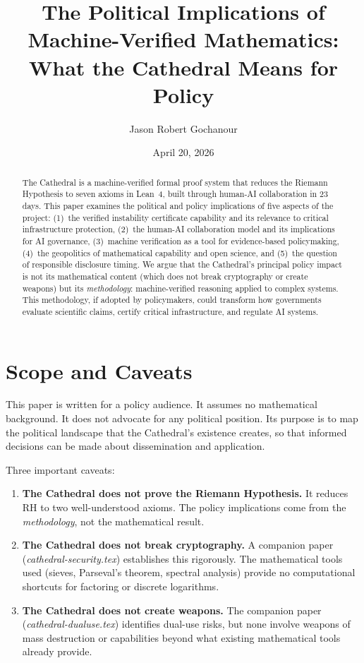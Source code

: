 \documentclass[11pt,a4paper]{article}
\title{%
  The Political Implications of Machine-Verified Mathematics:\\
  What the Cathedral Means for Policy%
}
\author{
  Jason Robert Gochanour
}
\date{April 20, 2026}
\begin{document}
\maketitle

\begin{abstract}
The Cathedral is a machine-verified formal proof system that reduces
the Riemann Hypothesis to seven axioms in Lean~4, built through
human-AI collaboration in 23 days. This paper examines the political
and policy implications of five aspects of the project: (1)~the
verified instability certificate capability and its relevance to
critical infrastructure protection, (2)~the human-AI collaboration
model and its implications for AI governance, (3)~machine
verification as a tool for evidence-based policymaking,
(4)~the geopolitics of mathematical capability and open science, and
(5)~the question of responsible disclosure timing. We argue that
the Cathedral's principal policy impact is not its mathematical
content (which does not break cryptography or create weapons) but
its \emph{methodology}: machine-verified reasoning applied to
complex systems. This methodology, if adopted by policymakers,
could transform how governments evaluate scientific claims,
certify critical infrastructure, and regulate AI systems.
\end{abstract}

\tableofcontents

\section{Scope and Caveats}

This paper is written for a policy audience. It assumes no
mathematical background. It does not advocate for any political
position. Its purpose is to map the political landscape that
the Cathedral's existence creates, so that informed decisions can
be made about dissemination and application.

Three important caveats:

\begin{enumerate}
  \item \textbf{The Cathedral does not prove the Riemann Hypothesis.}
    It reduces RH to two well-understood axioms. The policy
    implications come from the \emph{methodology}, not the
    mathematical result.

  \item \textbf{The Cathedral does not break cryptography.} A
    companion paper (\emph{cathedral-security.tex}) establishes this
    rigorously. The mathematical tools used (sieves, Parseval's
    theorem, spectral analysis) provide no computational shortcuts
    for factoring or discrete logarithms.

  \item \textbf{The Cathedral does not create weapons.} The
    companion paper (\emph{cathedral-dualuse.tex}) identifies
    dual-use risks, but none involve weapons of mass destruction
    or capabilities beyond what existing mathematical tools already
    provide.
\end{enumerate}
\end{document}
